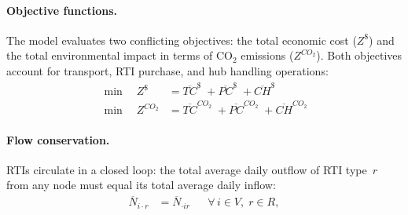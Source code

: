 



\paragraph{Objective functions.}
The model evaluates two conflicting objectives: the total economic cost ($Z^{\$}$) and the total environmental impact in terms of $\text{CO}_2$ emissions ($Z^{CO_2}$). Both objectives account for transport, RTI purchase, and hub handling operations:
%
\begin{align}
  \min \quad Z^{\$} &= \overline{TC}^{\$} \;+ \overline{PC}^{\$}\; + \overline{CH}^{\$} \label{eq:objective-cost} \\
  \min \quad Z^{CO_2} &= \overline{TC}^{CO_2} \;+\overline{PC}^{CO_2} \; + \overline{CH}^{CO_2} \label{eq:objective-emissions}
\end{align}


\paragraph{Flow conservation.}
RTIs circulate in a closed loop: the total average daily outflow of RTI
type~$r$ from any node must equal its total average daily inflow:
%
\begin{align}
  \overline{N}_{i\cdot r} &= \overline{N}_{\cdot i r}
  && \forall\,i\in V,\;r\in R,
  \label{eq:conservation}
\end{align}


